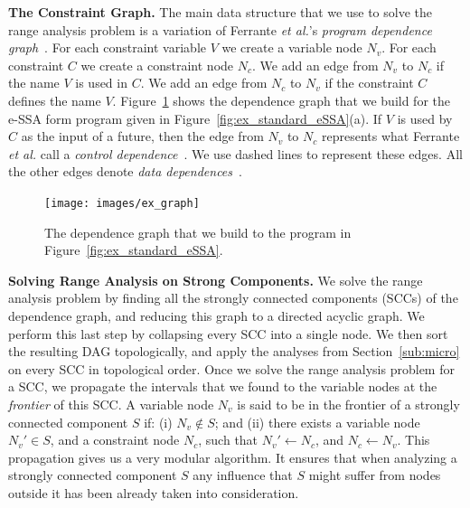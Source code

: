 \documentclass{llncs}
\begin{document}
\noindent
\textbf{The Constraint Graph.}
The main data structure that we use to solve the range analysis problem is
a variation of Ferrante {\em et al.}'s {\em program dependence
graph}~\cite{Ferrante87}.
For each constraint variable $V$ we create a variable node $N_v$.
For each constraint $C$ we create a constraint node $N_c$.
We add an edge from $N_v$ to $N_c$ if the name $V$ is used in $C$.
We add an edge from $N_c$ to $N_v$ if the constraint $C$ defines the name
$V$.
Figure~\ref{fig:ex_graph} shows the dependence graph that we build for the
e-SSA form program given in Figure~\ref{fig:ex_standard_eSSA}(a).
If $V$ is used by $C$ as the input of a future, then the edge from
$N_v$ to $N_c$ represents what Ferrante {\em et al.} call a {\em control
dependence}~\cite[p.323]{Ferrante87}.
We use dashed lines to represent these edges.
All the other edges denote {\em data dependences}~\cite[p.322]{Ferrante87}.

\begin{figure}[t!]
\begin{center}
\texttt{[image: images/ex\_graph]}
\end{center}
\caption{\label{fig:ex_graph}
The dependence graph that we build to the program in
Figure~\ref{fig:ex_standard_eSSA}.}
\end{figure}

\noindent
\textbf{Solving Range Analysis on Strong Components.}
We solve the range analysis
problem by finding all the strongly connected components (SCCs) of the
dependence graph, and reducing this graph to a directed acyclic graph.
We perform this last step by collapsing every SCC into a single node.
We then sort the resulting DAG topologically, and apply the analyses from
Section~\ref{sub:micro} on every SCC in topological order.
Once we solve the range analysis problem for a SCC, we propagate the
intervals that we found to the variable nodes at the {\em frontier} of this
SCC.
A variable node $N_v$ is said to be in the frontier of a strongly connected
component $S$ if:
(i) $N_v \notin S$; and
(ii) there exists a variable node $N_v' \in S$, and a constraint node $N_c$,
such that $N_v' \leftarrow N_c$, and $N_c \leftarrow N_v$.
This propagation gives us a very modular algorithm.
It ensures that when analyzing a strongly connected component $S$ any influence
that $S$ might suffer from nodes outside it has been already
taken into consideration.
\end{document}
